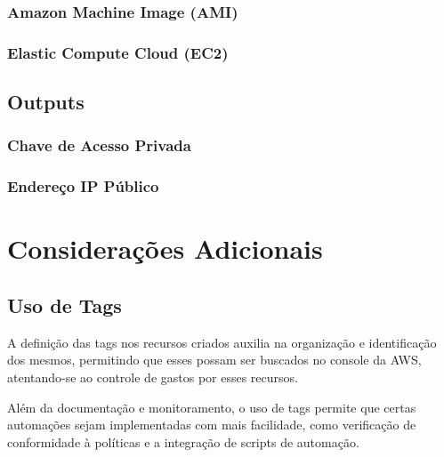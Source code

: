 \documentclass{article}
\begin{document}
\subsubsection{Amazon Machine Image (AMI)}
\subsubsection{Elastic Compute Cloud (EC2)}
\subsection{Outputs}
\subsubsection{Chave de Acesso Privada}
\subsubsection{Endereço IP Público}

\section{Considerações Adicionais}
\subsection{Uso de Tags}
A definição das tags nos recursos criados auxilia na organização e identificação dos mesmos, permitindo que esses possam ser buscados no console da AWS, atentando-se ao controle de gastos por esses recursos.

Além da documentação e monitoramento, o uso de tags permite que certas automações sejam implementadas com mais facilidade, como verificação de conformidade à políticas e a integração de scripts de automação.
\end{document}
